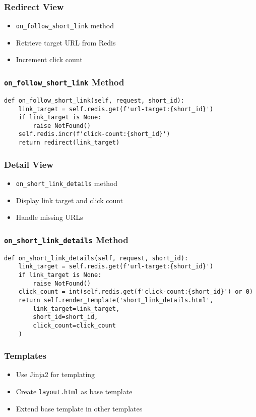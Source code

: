 \documentclass{beamer}
\begin{document}
\begin{frame}
\frametitle{Redirect View}
\begin{itemize}
    \item \texttt{on\_follow\_short\_link} method
    \item Retrieve target URL from Redis
    \item Increment click count
\end{itemize}
\end{frame}
\begin{frame}[fragile]
\frametitle{\texttt{on\_follow\_short\_link} Method}
\begin{verbatim}
def on_follow_short_link(self, request, short_id):
    link_target = self.redis.get(f'url-target:{short_id}')
    if link_target is None:
        raise NotFound()
    self.redis.incr(f'click-count:{short_id}')
    return redirect(link_target)
\end{verbatim}
\end{frame}

\begin{frame}
\frametitle{Detail View}
\begin{itemize}
    \item \texttt{on\_short\_link\_details} method
    \item Display link target and click count
    \item Handle missing URLs
\end{itemize}
\end{frame}

\begin{frame}[fragile]
\frametitle{\texttt{on\_short\_link\_details} Method}
\begin{verbatim}
def on_short_link_details(self, request, short_id):
    link_target = self.redis.get(f'url-target:{short_id}')
    if link_target is None:
        raise NotFound()
    click_count = int(self.redis.get(f'click-count:{short_id}') or 0)
    return self.render_template('short_link_details.html',
        link_target=link_target,
        short_id=short_id,
        click_count=click_count
    )
\end{verbatim}
\end{frame}
\begin{frame}
\frametitle{Templates}
\begin{itemize}
    \item Use Jinja2 for templating
    \item Create \texttt{layout.html} as base template
    \item Extend base template in other templates
\end{itemize}
\end{frame}
\end{document}
